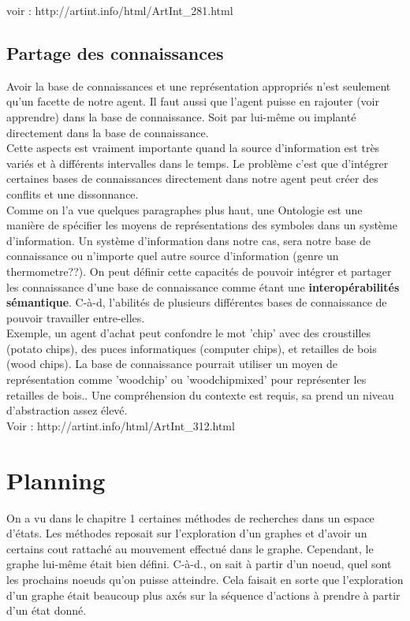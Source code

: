 \documentclass[oneside]{book}
\begin{document}
voir :     http://artint.info/html/ArtInt\_281.html
\subsection{Partage des connaissances}
Avoir la base de connaissances et une représentation appropriés n'est seulement qu'un facette de notre agent. Il faut aussi que l'agent puisse en rajouter (voir apprendre) dans la base de connaissance. Soit par lui-même ou implanté directement dans la base de connaissance.\\

Cette aspects est vraiment importante quand la source d'information est très variés et à différents intervalles dans le temps. Le problème c'est que d'intégrer certaines bases de connaissances directement dans notre agent peut créer des conflits et une dissonnance. \\

Comme on l'a vue quelques paragraphes plus haut, une Ontologie est une manière de spécifier les moyens de représentations des symboles dans un système d'information. Un système d'information dans notre cas, sera notre base de connaissance ou n'importe quel autre source d'information (genre un thermometre??). On peut définir cette capacités de pouvoir intégrer et partager les connaissance d'une base de connaissance comme étant une \textbf{interopérabilités sémantique}. C-à-d, l'abilités de plusieurs différentes bases de connaissance de pouvoir travailler entre-elles.\\

Exemple, un agent d'achat peut confondre le mot 'chip' avec des croustilles (potato chips), des puces informatiques (computer chips), et retailles de bois (wood chips). La base de connaissance pourrait utiliser un moyen de représentation comme 'woodchip' ou 'woodchipmixed' pour représenter les retailles de bois.. Une compréhension du contexte est requis, sa prend un niveau d'abstraction assez élevé.\\

Voir :       http://artint.info/html/ArtInt\_312.html

\section{Planning}
On a vu dans le chapitre 1 certaines méthodes de recherches dans un espace d'états. Les méthodes reposait sur l'exploration d'un graphes et d'avoir un certains cout rattaché au mouvement effectué dans le graphe. Cependant, le graphe lui-même était bien défini. C-à-d., on sait à partir d'un noeud, quel sont les prochains noeuds qu'on puisse atteindre. Cela faisait en sorte que l'exploration d'un graphe était beaucoup plus axés sur la séquence d'actions à prendre à partir d'un état donné.
\end{document}
